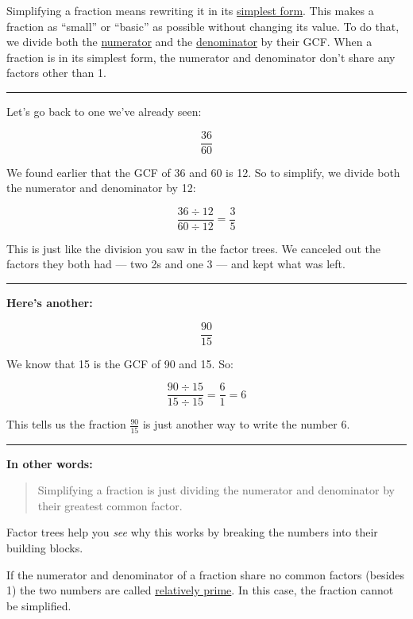 \documentclass[
  letterpaper,
  DIV=11,
  numbers=noendperiod]{scrreprt}
\begin{document}
Simplifying a fraction means rewriting it in its
\href{./glossary.html\#glossary-simplest-form}{simplest form}. This
makes a fraction as ``small'' or ``basic'' as possible without changing
its value. To do that, we divide both the
\href{./glossary.html\#glossary-numerator}{numerator} and the
\href{./glossary.html\#glossary-denominator}{denominator} by their GCF.
When a fraction is in its simplest form, the numerator and denominator
don't share any factors other than 1.

\begin{center}\rule{0.5\linewidth}{0.5pt}\end{center}

Let's go back to one we've already seen:

\[
\frac{36}{60}
\]

We found earlier that the GCF of 36 and 60 is 12. So to simplify, we
divide both the numerator and denominator by 12:

\[
\frac{36 \div 12}{60 \div 12} = \frac{3}{5}
\]

This is just like the division you saw in the factor trees. We canceled
out the factors they both had --- two 2s and one 3 --- and kept what was
left.

\begin{center}\rule{0.5\linewidth}{0.5pt}\end{center}

\textbf{Here's another:}

\[
\frac{90}{15}
\]

We know that 15 is the GCF of 90 and 15. So:

\[
\frac{90 \div 15}{15 \div 15} = \frac{6}{1} = 6
\]

This tells us the fraction \(\frac{90}{15}\) is just another way to
write the number 6.

\begin{center}\rule{0.5\linewidth}{0.5pt}\end{center}

\textbf{In other words:}

\begin{quote}
Simplifying a fraction is just dividing the numerator and denominator by
their greatest common factor.
\end{quote}

Factor trees help you \emph{see} why this works by breaking the numbers
into their building blocks.

If the numerator and denominator of a fraction share no common factors
(besides 1) the two numbers are called
\href{./glossary.html\#glossary-relatively-prime}{relatively prime}. In
this case, the fraction cannot be simplified.
\end{document}
